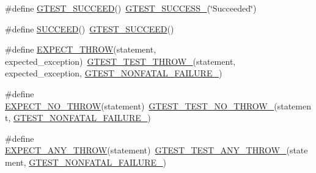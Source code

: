 \begin{DoxyCompactItemize}
\item 
\#define \mbox{\hyperlink{_obj__test_2lib_2googletest-release-1_88_81_2googletest_2include_2gtest_2gtest_8h_a2690441c38202728f4159ac2462d9720}{G\+T\+E\+S\+T\+\_\+\+S\+U\+C\+C\+E\+ED}}()~\mbox{\hyperlink{_obj__test_2lib_2googletest-release-1_88_81_2googletest_2include_2gtest_2internal_2gtest-internal_8h_abe012b550eb3807e8c49f7e161bd1567}{G\+T\+E\+S\+T\+\_\+\+S\+U\+C\+C\+E\+S\+S\+\_\+}}(\char`\"{}Succeeded\char`\"{})
\item 
\#define \mbox{\hyperlink{_obj__test_2lib_2googletest-release-1_88_81_2googletest_2include_2gtest_2gtest_8h_a75adcdf89f69b0b615e395daafc315af}{S\+U\+C\+C\+E\+ED}}()~\mbox{\hyperlink{_obj__test_2lib_2googletest-release-1_88_81_2googletest_2include_2gtest_2gtest_8h_a2690441c38202728f4159ac2462d9720}{G\+T\+E\+S\+T\+\_\+\+S\+U\+C\+C\+E\+ED}}()
\item 
\#define \mbox{\hyperlink{_obj__test_2lib_2googletest-release-1_88_81_2googletest_2include_2gtest_2gtest_8h_a789842b4475eed948e6fd18390d5a859}{E\+X\+P\+E\+C\+T\+\_\+\+T\+H\+R\+OW}}(statement,  expected\+\_\+exception)~\mbox{\hyperlink{_obj__test_2lib_2googletest-release-1_88_81_2googletest_2include_2gtest_2internal_2gtest-internal_8h_a3f71db93eaf30b0cfca9612b9ac32106}{G\+T\+E\+S\+T\+\_\+\+T\+E\+S\+T\+\_\+\+T\+H\+R\+O\+W\+\_\+}}(statement, expected\+\_\+exception, \mbox{\hyperlink{_obj__test_2lib_2googletest-release-1_88_81_2googletest_2include_2gtest_2internal_2gtest-internal_8h_a6cb7482cfa03661a91c698eb5895f642}{G\+T\+E\+S\+T\+\_\+\+N\+O\+N\+F\+A\+T\+A\+L\+\_\+\+F\+A\+I\+L\+U\+R\+E\+\_\+}})
\item 
\#define \mbox{\hyperlink{_obj__test_2lib_2googletest-release-1_88_81_2googletest_2include_2gtest_2gtest_8h_a2743a1438137ad857aa3f9fec3ff67ec}{E\+X\+P\+E\+C\+T\+\_\+\+N\+O\+\_\+\+T\+H\+R\+OW}}(statement)~\mbox{\hyperlink{_obj__test_2lib_2googletest-release-1_88_81_2googletest_2include_2gtest_2internal_2gtest-internal_8h_a9a109d026b5a904646437d7570e13581}{G\+T\+E\+S\+T\+\_\+\+T\+E\+S\+T\+\_\+\+N\+O\+\_\+\+T\+H\+R\+O\+W\+\_\+}}(statement, \mbox{\hyperlink{_obj__test_2lib_2googletest-release-1_88_81_2googletest_2include_2gtest_2internal_2gtest-internal_8h_a6cb7482cfa03661a91c698eb5895f642}{G\+T\+E\+S\+T\+\_\+\+N\+O\+N\+F\+A\+T\+A\+L\+\_\+\+F\+A\+I\+L\+U\+R\+E\+\_\+}})
\item 
\#define \mbox{\hyperlink{_obj__test_2lib_2googletest-release-1_88_81_2googletest_2include_2gtest_2gtest_8h_a9be43f44d148e8a8d6a89c864bf4e461}{E\+X\+P\+E\+C\+T\+\_\+\+A\+N\+Y\+\_\+\+T\+H\+R\+OW}}(statement)~\mbox{\hyperlink{_obj__test_2lib_2googletest-release-1_88_81_2googletest_2include_2gtest_2internal_2gtest-internal_8h_af48bbd26d54d4afc5e4cef39b1c76ba3}{G\+T\+E\+S\+T\+\_\+\+T\+E\+S\+T\+\_\+\+A\+N\+Y\+\_\+\+T\+H\+R\+O\+W\+\_\+}}(statement, \mbox{\hyperlink{_obj__test_2lib_2googletest-release-1_88_81_2googletest_2include_2gtest_2internal_2gtest-internal_8h_a6cb7482cfa03661a91c698eb5895f642}{G\+T\+E\+S\+T\+\_\+\+N\+O\+N\+F\+A\+T\+A\+L\+\_\+\+F\+A\+I\+L\+U\+R\+E\+\_\+}})

\end{DoxyCompactItemize}
